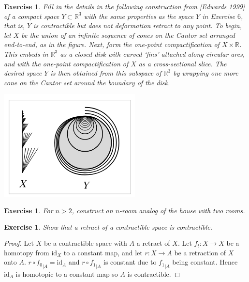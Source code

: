 \documentclass{article}
\newtheorem{exercise}[theorem]{Exercise}
\begin{document}
\begin{exercise}
Fill in the details in the following construction from
[Edwards 1999] of a compact space $Y\subset\mathbb{R}^3$ with the
same properties as the space $Y$ in Exercise $6$, that is, $Y$
is contractible but does not deformation retract to any
point. To begin, let $X$ be the union of an infinite sequence of cones on the Cantor set arranged end-to-end,
as in the figure. Next, form the one-point compactification of $X\times\mathbb{R}$. This embeds in $\mathbb{R}^3$ as a closed disk with curved ‘fins’ attached along circular arcs, and with the one-point compactification of $X$ as a cross-sectional slice.
The desired space $Y$ is then obtained from this subspace of $\mathbb{R}^3$ by wrapping one more
cone on the Cantor set around the boundary of the disk.

\includegraphics[scale=0.5]{Screenshot 2025-07-21 at 17-47-12 AT.dvi - AT.pdf.png}
\end{exercise}

\begin{exercise}
For $n>2$, construct an $n$-room analog of the house with two rooms.
\end{exercise}

\begin{exercise}
Show that a retract of a contractible space is contractible.
\end{exercise}
\begin{proof}
Let $X$ be a contractible space with $A$ a retract of $X$. Let $f_t:X\to X$ be a homotopy from $\text{id}_X$ to a constant map, and let $r:X\to A$ be a retraction of $X$ onto $A$. $r\circ {f_0}_{|A}=\text{id}_A$ and $r\circ {f_1}_{|A}$ is constant due to ${f_1}_{|A}$ being constant. Hence $\text{id}_A$ is homotopic to a constant map so $A$ is contractible.
\end{proof}
\end{document}
